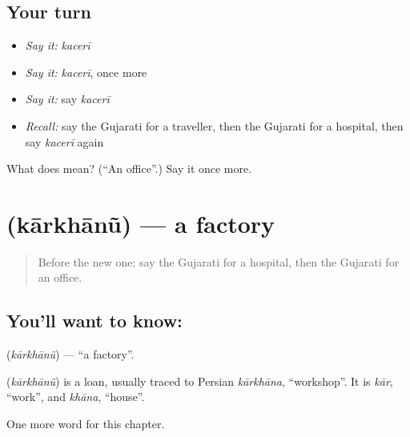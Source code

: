 \subsection*{Your turn}
\begin{itemize}
\raggedright
  \item \emph{Say it:} \emph{kacerī}
  \item \emph{Say it:} \emph{kacerī}, once more
  \item \emph{Say it:} say \emph{kacerī}
  \item \emph{Recall:} say the Gujarati for a traveller, then the Gujarati for a hospital, then say \emph{kacerī} again
\end{itemize}

\begin{tcolorbox}[breakable,colback=teal!4,colframe=teal!35!black,title={Before you move on}]
What does  mean? (\textquotedblleft{}An office\textquotedblright{}.) Say it once more.
\end{tcolorbox}
\section[\texorpdfstring{\gu{કારખાનું} (kārkhānũ)}{કારખાનું (kārkhānũ)}]{ (kārkhānũ) — a factory}

\label{lesson:GU-C128-karkhanu}



\begin{quote}
Before the new one: say the Gujarati for a hospital, then the Gujarati for an office.
\end{quote}

\subsection*{You'll want to know: }
\textbf{} (\emph{kārkhānũ}) — \textquotedblleft{}a factory\textquotedblright{}.

\begin{cousinweb}
\textbf{} (\emph{kārkhānũ}) is a loan, usually traced to Persian \emph{kārkhāna}, \textquotedblleft{}workshop\textquotedblright{}. It is \emph{kār}, \textquotedblleft{}work\textquotedblright{}, and \emph{khāna}, \textquotedblleft{}house\textquotedblright{}.
\end{cousinweb}

\begin{grammarlens}[title={What you've built}]
One more word for this chapter.
\end{grammarlens}

